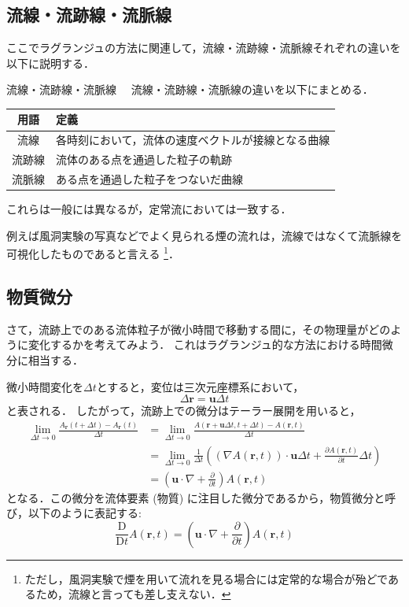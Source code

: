 \documentclass[uplatex,dvipdfmx,a4j,11pt]{jsreport}
\newcommand{\Diff}{\mathrm{D}} %
\numberwithin{equation}{chapter}
\begin{document}
\subsection{流線・流跡線・流脈線}

ここでラグランジュの方法に関連して，流線・流跡線・流脈線それぞれの違いを以下に説明する．
\begin{definition}{流線・流跡線・流脈線}{}{}
  　流線・流跡線・流脈線の違いを以下にまとめる．
  \begin{center}
  \begin{tabular}{cl}
    \hline
    用語 & 定義 \\
    \hline
    流線 & 各時刻において，流体の速度ベクトルが接線となる曲線 \\
    流跡線 & 流体のある点を通過した粒子の軌跡 \\
    流脈線 & ある点を通過した粒子をつないだ曲線 \\
    \hline
  \end{tabular}
  \end{center}
  これらは一般には異なるが，定常流においては一致する．
\end{definition}
例えば風洞実験の写真などでよく見られる煙の流れは，流線ではなくて流脈線を可視化したものであると言える
\footnote{ただし，風洞実験で煙を用いて流れを見る場合には定常的な場合が殆どであるため，流線と言っても差し支えない．}．

\enskip

\subsection{物質微分}

さて，流跡上でのある流体粒子が微小時間で移動する間に，その物理量がどのように変化するかを考えてみよう．
これはラグランジュ的な方法における時間微分に相当する．

微小時間変化を$\Delta t$とすると，変位は三次元座標系において，
\begin{equation*}
  \Delta \mathbf{r} = \mathbf{u} \Delta t
\end{equation*}
と表される．
したがって，流跡上での微分はテーラー展開を用いると，
\begin{align*}
  \lim_{\Delta t \to 0} \frac{A_\mathbf{r}(t + \Delta t) - A_\mathbf{r}(t)}{\Delta t}
  &= \lim_{\Delta t \to 0} \frac{A(\mathbf{r} + \mathbf{u} \Delta t, t + \Delta t) - A(\mathbf{r}, t)}{\Delta t}\\
  &= \lim_{\Delta t \to 0} \frac{1}{\Delta t}\left((\nabla A(\mathbf{r}, t))\cdot \mathbf{u}\Delta t  + \frac{\partial A(\mathbf{r}, t)}{\partial t}\Delta t\right)\\
  &= \left(\mathbf{u}\cdot \nabla + \frac{\partial }{\partial t}\right) A(\mathbf{r}, t)
\end{align*}
となる．この微分を流体要素 (物質) に注目した微分であるから，物質微分と呼び，以下のように表記する:
\begin{equation*}
  \frac{\Diff}{\Diff t} A(\mathbf{r}, t) = \left(\mathbf{u}\cdot \nabla + \frac{\partial }{\partial t}\right) A(\mathbf{r}, t)
\end{equation*}
\end{document}

